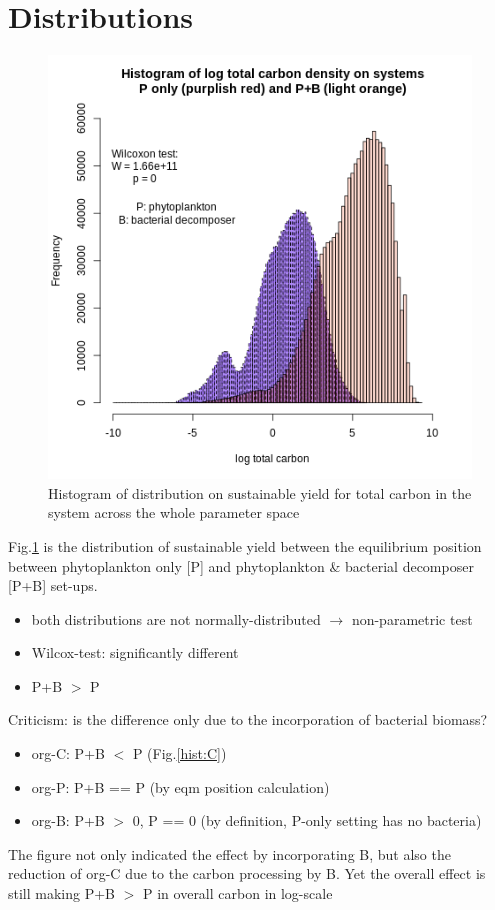 \documentclass[../thesis.tex]{subfiles} %
\begin{document}
\section{Distributions}
\begin{figure}[H]
    \centering
    \includegraphics[width=.7\linewidth]{report/media/hist_PvsPB_A.png}
    \caption{Histogram of distribution on sustainable yield for total carbon in the system across the whole parameter space}
    \label{hist:A}
\end{figure}

Fig.\ref{hist:A} is the distribution of sustainable yield between the equilibrium position between phytoplankton only [P] and phytoplankton \& bacterial decomposer [P+B] set-ups.
\begin{itemize}
    \item both distributions are not normally-distributed $\rightarrow$ non-parametric test
    \item Wilcox-test: significantly different
    \item P+B $>$ P
\end{itemize}

Criticism: is the difference only due to the incorporation of bacterial biomass?
\begin{itemize}
    \item org-C: P+B $<$ P (Fig.\ref{hist:C})
    \item org-P: P+B == P (by eqm position calculation)
    \item org-B: P+B $>$ 0, P == 0 (by definition, P-only setting has no bacteria)
\end{itemize}
The figure not only indicated the effect by incorporating B, but also the reduction of org-C due to the carbon processing by B.  Yet the overall effect is still making P+B $>$ P in overall carbon in log-scale
\end{document}
